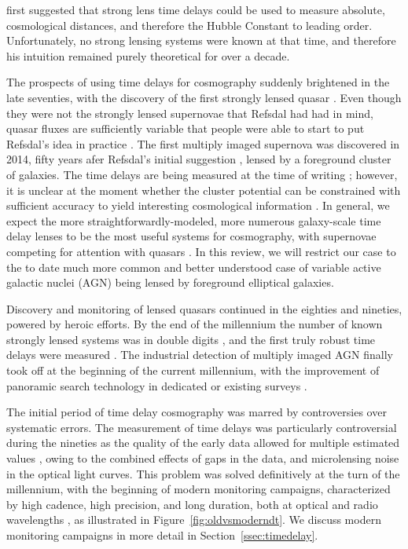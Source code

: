 \citet{Ref64} first suggested that strong lens time delays could be
used to measure absolute, cosmological distances, and
therefore the Hubble Constant to leading order. Unfortunately, no
strong lensing systems were known at that time, and therefore his
intuition remained purely theoretical for over a decade.

The prospects of using time delays for cosmography suddenly brightened
in the late seventies, with the discovery of the first strongly lensed
quasar \citep{WCW79}. Even though they were not the strongly lensed
supernovae that Refsdal had had in mind, quasar fluxes are sufficiently
variable \citep{Van82} that people were able to start to put Refsdal's
idea in practice \citep{Van89}.
The first multiply imaged supernova was discovered in 2014,
fifty years afer Refsdal's initial suggestion \citep{Kel++15}, lensed
by a foreground cluster of galaxies. The time delays are being
measured at the time of writing
\citep{Rod++16,Kel++16}; however, it is unclear at the moment whether the
cluster potential can be constrained with sufficient accuracy to
yield interesting cosmological information \citep{Tre++16}. In general,
we expect the more straightforwardly-modeled, more numerous
galaxy-scale time delay lenses to be the most useful systems for
cosmography, with supernovae competing for attention with quasars \citep{O+M10}.
In this review, we will restrict our case to the to date much more common and
better understood case of variable active galactic nuclei (AGN) being lensed by
foreground elliptical galaxies.

Discovery and monitoring of lensed quasars continued in the eighties and
nineties, powered by heroic efforts. By the end of the millennium the
number of known strongly lensed systems was in double digits
\citep{CSS02}, and the first truly robust time delays were measured
\citep{Kun++97,Sch++97}.
The industrial detection of multiply imaged AGN finally took off at the
beginning of the current millennium, with the improvement of panoramic
search technology in dedicated or existing surveys
\citep{Bro++03,Oguri:2006p5865,Agn++15}.

The initial period of time delay cosmography was marred by controversies over
systematic errors.  The measurement of time delays was particularly
controversial during the nineties as the quality of the early data
allowed for multiple estimated values \citep{PRH92}, owing to the combined
effects of gaps in the data, and microlensing noise in the optical
light curves. This problem was solved definitively at the turn of the
millennium, with the beginning of modern monitoring campaigns,
characterized by high cadence, high precision, and long duration, both
at optical and radio wavelengths
\citep{Fas++99,Fas++02,Bur++02,Eig++05}, as illustrated in
Figure~\ref{fig:oldvsmoderndt}. We discuss
modern monitoring campaigns in more detail in Section~\ref{ssec:timedelay}.

